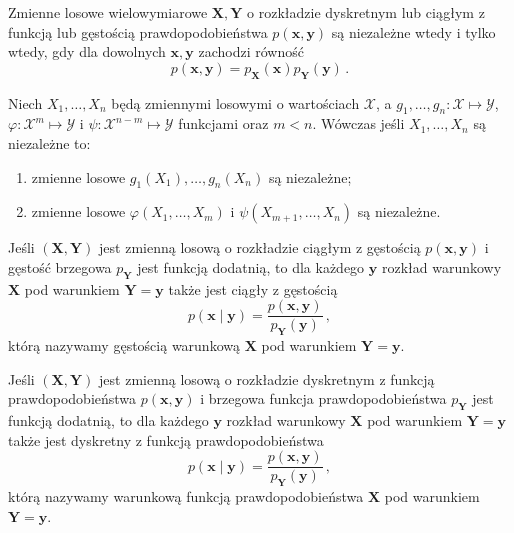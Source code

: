 \documentclass{myclass}
\numberwithin{equation}{section}
\begin{document}
\begin{theorem}
Zmienne losowe wielowymiarowe \(\mathbf{X}, \mathbf{Y}\) o rozkładzie dyskretnym lub ciągłym z
funkcją lub gęstością prawdopodobieństwa \(p(\mathbf{x},\mathbf{y})\) są niezależne wtedy i tylko
wtedy, gdy dla dowolnych \(\mathbf{x}, \mathbf{y}\) zachodzi równość
\begin{equation*}
    p(\mathbf{x}, \mathbf{y}) = p_\mathbf{X}(\mathbf{x}) p_\mathbf{Y}(\mathbf{y})\,.    
\end{equation*}
\end{theorem}

\begin{theorem}
Niech \(X_1,\ldots,X_n\) będą zmiennymi losowymi o wartościach \(\mathcal{X}\), a \(g_1,\ldots,g_n:
\mathcal{X} \mapsto \mathcal{Y}\), \(\varphi: \mathcal{X}^m \mapsto \mathcal{Y}\) i \(\psi:
\mathcal{X}^{n-m}\mapsto\mathcal{Y}\) funkcjami oraz \(m < n\). Wówczas jeśli \(X_1,\ldots,X_n\) są
niezależne to:
\begin{enumerate}
    
    \item zmienne losowe \(g_1(X_1),\ldots,g_n(X_n)\) są niezależne;

    \item zmienne losowe \(\varphi(X_1,\ldots,X_m)\) i \(\psi(X_{m+1},\ldots,X_n)\) są niezależne.

\end{enumerate}
\end{theorem}

Jeśli \((\mathbf{X}, \mathbf{Y})\) jest zmienną losową o rozkładzie ciągłym z gęstością
\(p(\mathbf{x}, \mathbf{y})\) i gęstość brzegowa \(p_\mathbf{Y}\) jest funkcją dodatnią, to dla
każdego \(\mathbf{y}\) rozkład warunkowy \(\mathbf{X}\) pod warunkiem \(\mathbf{Y} = \mathbf{y}\)
także jest ciągły z gęstością
\begin{equation}
    p(\mathbf{x} \mid \mathbf{y}) = \frac{p(\mathbf{x}, \mathbf{y})}{p_\mathbf{Y}(\mathbf{y})}\,,
\end{equation}
którą nazywamy gęstością warunkową \(\mathbf{X}\) pod warunkiem \(\mathbf{Y} = \mathbf{y}\).

Jeśli \((\mathbf{X}, \mathbf{Y})\) jest zmienną losową o rozkładzie dyskretnym z funkcją
prawdopodobieństwa \(p(\mathbf{x}, \mathbf{y})\) i brzegowa funkcja prawdopodobieństwa
\(p_\mathbf{Y}\) jest funkcją dodatnią, to dla każdego \(\mathbf{y}\) rozkład warunkowy
\(\mathbf{X}\) pod warunkiem \(\mathbf{Y} = \mathbf{y}\) także jest dyskretny z funkcją
prawdopodobieństwa
\begin{equation}
    p(\mathbf{x} \mid \mathbf{y}) = \frac{p(\mathbf{x}, \mathbf{y})}{p_\mathbf{Y}(\mathbf{y})}\,,
\end{equation}
którą nazywamy warunkową funkcją prawdopodobieństwa \(\mathbf{X}\) pod warunkiem \(\mathbf{Y} =
\mathbf{y}\).
\end{document}
